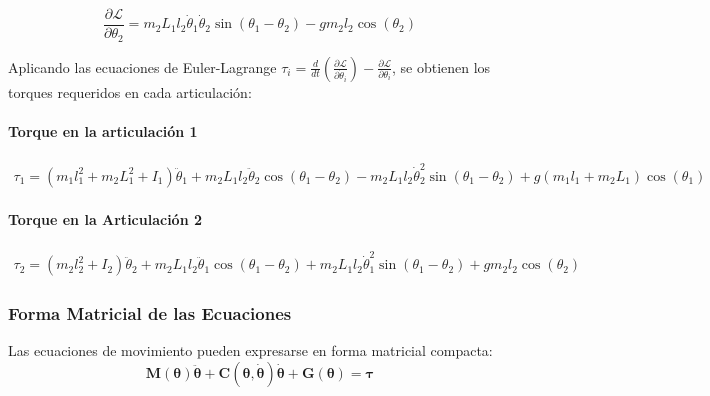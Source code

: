 \begin{equation}
\frac{\partial \mathcal{L}}{\partial \theta_2} = m_2L_1l_2\dot{\theta}_1\dot{\theta}_2\sin(\theta_1 - \theta_2) - gm_2l_2\cos(\theta_2)
\end{equation}

Aplicando las ecuaciones de Euler-Lagrange $\tau_i = \frac{d}{dt}\left(\frac{\partial \mathcal{L}}{\partial \dot{\theta}_i}\right) - \frac{\partial \mathcal{L}}{\partial \theta_i}$, se obtienen los torques requeridos en cada articulación:

\paragraph{Torque en la articulación 1}


\begin{multline}
\tau_1 = (m_1l_1^2 + m_2L_1^2 + I_1)\ddot{\theta}_1 + m_2L_1l_2\ddot{\theta}_2\cos(\theta_1 - \theta_2) - m_2L_1l_2\dot{\theta}_2^2\sin(\theta_1 - \theta_2) + g(m_1l_1 + m_2L_1)\cos(\theta_1)
\label{ec:torqueT1}
\end{multline}

\paragraph{Torque en la Articulación 2}

\begin{multline}
\tau_2 = (m_2l_2^2 + I_2)\ddot{\theta}_2 + m_2L_1l_2\ddot{\theta}_1\cos(\theta_1 - \theta_2) + m_2L_1l_2\dot{\theta}_1^2\sin(\theta_1 - \theta_2) + gm_2l_2\cos(\theta_2)
\label{ec:torqueT2}
\end{multline}

\subsubsection{Forma Matricial de las Ecuaciones}

Las ecuaciones de movimiento pueden expresarse en forma matricial compacta:
\begin{equation}
\mathbf{M}(\boldsymbol{\theta})\ddot{\boldsymbol{\theta}} + \mathbf{C}(\boldsymbol{\theta}, \dot{\boldsymbol{\theta}})\dot{\boldsymbol{\theta}} + \mathbf{G}(\boldsymbol{\theta}) = \boldsymbol{\tau}
\end{equation}

